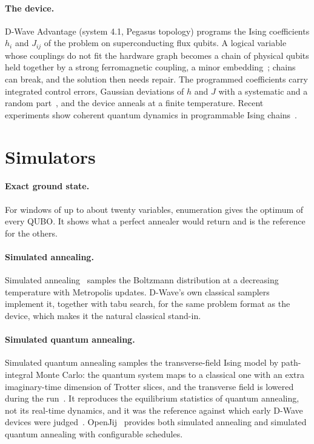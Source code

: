 \documentclass[11pt]{article}
\begin{document}
\paragraph{The device.}
D-Wave Advantage (system 4.1, Pegasus topology) programs the Ising
coefficients $h_i$ and $J_{ij}$ of the problem on superconducting flux qubits.
A logical variable whose couplings do not fit the hardware graph becomes a
chain of physical qubits held together by a strong ferromagnetic coupling, a
minor embedding~\cite{choi2008minor}; chains can break, and the solution then
needs repair. The programmed coefficients carry integrated control errors,
Gaussian deviations of $h$ and $J$ with a systematic and a random
part~\cite{dwaveice}, and the device anneals at a finite temperature. Recent
experiments show coherent quantum dynamics in programmable Ising
chains~\cite{king2022coherent}.

\section{Simulators}

\paragraph{Exact ground state.}
For windows of up to about twenty variables, enumeration gives the optimum of
every QUBO. It shows what a perfect annealer would return and is the
reference for the others.

\paragraph{Simulated annealing.}
Simulated annealing~\cite{kirkpatrick1983sa} samples the Boltzmann
distribution at a decreasing temperature with Metropolis updates. D-Wave's
own classical samplers~\cite{dwavesamplers} implement it, together with tabu
search, for the same problem format as the device, which makes it the
natural classical stand-in.

\paragraph{Simulated quantum annealing.}
Simulated quantum annealing samples the transverse-field Ising model by
path-integral Monte Carlo: the quantum system maps to a classical one with an
extra imaginary-time dimension of Trotter slices, and the transverse field is
lowered during the run~\cite{santoro2002qa,martonak2002pimc}. It reproduces the
equilibrium statistics of quantum annealing, not its real-time dynamics, and it
was the reference against which early D-Wave devices were
judged~\cite{boixo2014evidence}. OpenJij~\cite{openjij} provides both simulated
annealing and simulated quantum annealing with configurable schedules.
\end{document}
